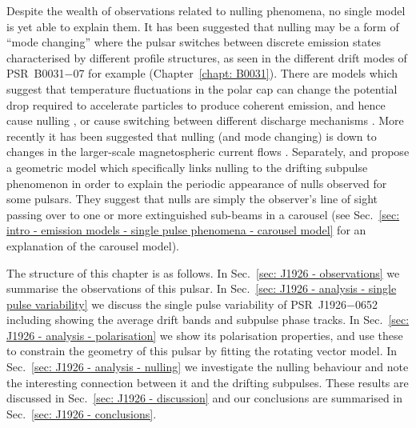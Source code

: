 Despite the wealth of observations related to nulling phenomena, no single model is yet able to explain them. It has been suggested that nulling may be a form of ``mode changing'' where the pulsar switches between discrete emission states characterised by different profile structures, as seen in the different drift modes of PSR~B0031$-$07 for example (Chapter~\ref{chapt: B0031}). There are models which suggest that temperature fluctuations in the polar cap can change the potential drop required to accelerate particles to produce coherent emission, and hence cause nulling \citep{Cxxx1981, DCHR1986}, or cause switching between different discharge mechanisms \citep{DHxx1986, ZQLH1997, ZQHx1997}. More recently it has been suggested that nulling (and mode changing) is down to changes in the larger-scale magnetospheric current flows \citep{WMJx2007,LHK+2010,Txxx2010b}. Separately, \citet{HRxx2007,HRxx2009} and \citet{RWxx2008} propose a geometric model which specifically links nulling to the drifting subpulse phenomenon in order to explain the periodic appearance of nulls observed for some pulsars. They suggest that nulls are simply the observer's line of sight passing over to one or more extinguished sub-beams in a carousel (see Sec.~\ref{sec: intro - emission models - single pulse phenomena - carousel model} for an explanation of the carousel model).


The structure of this chapter is as follows. In Sec.~\ref{sec: J1926 - observations} we summarise the observations of this pulsar. In Sec.~\ref{sec: J1926 - analysis - single pulse variability} we discuss the single pulse variability of PSR~J1926$-$0652 including showing the average drift bands and subpulse phase tracks. In Sec.~\ref{sec: J1926 - analysis - polarisation} we show its polarisation properties, and use these to constrain the geometry of this pulsar by fitting the rotating vector model. In Sec.~\ref{sec: J1926 - analysis - nulling} we investigate the nulling behaviour and note the interesting connection between it and the drifting subpulses. These results are discussed in Sec.~\ref{sec: J1926 - discussion} and our conclusions are summarised in Sec.~\ref{sec: J1926 - conclusions}.




